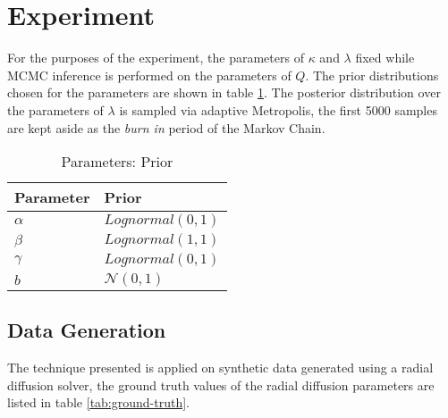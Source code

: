 \section{Experiment}\label{sec:exp}

For the purposes of the experiment, the parameters of $\kappa$ and $\lambda$ fixed while MCMC inference 
is performed on the parameters of $Q$. The prior distributions chosen for the parameters 
are shown in table \ref{tab:prior}. The posterior distribution over the parameters of $\lambda$ is 
sampled via adaptive Metropolis, the first 5000 samples are kept aside as the \emph{burn in} period
of the Markov Chain.

\begin{table}[t]
  \caption{Parameters: Prior}
  \label{tab:prior}
  \centering
  \begin{tabular}{ll}
    \hline
    \textbf{Parameter} & \textbf{Prior}\\
    \hline
    $\alpha$ & $Lognormal(0, 1)$ \\
    $\beta$  & $Lognormal(1, 1)$ \\ 
    $\gamma$ & $Lognormal(0, 1)$ \\ 
    $b$ & $\mathcal{N}(0, 1)$ \\
    \hline
  \end{tabular}
\end{table}


\subsection*{Data Generation}

The technique presented is applied on synthetic data generated using a radial diffusion solver, 
the ground truth values of the radial diffusion parameters are listed in table \ref{tab:ground-truth}.

